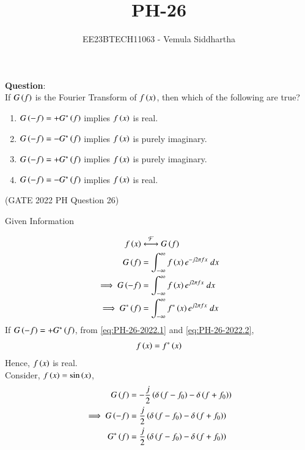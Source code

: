 \documentclass[journal,12pt,twocolumn]{IEEEtran}
\theoremstyle{remark}
\begin{document}

\vspace{3cm}

\title{PH-26}
\author{EE23BTECH11063 - Vemula Siddhartha}
\maketitle
\newpage
\bigskip

\renewcommand{\thefigure}{\theenumi}
\renewcommand{\thetable}{\theenumi}
\textbf{Question}:\\
If $G\left(f\right)$ is the Fourier Transform of $f\left(x\right)$, then which of the following are true?
\begin{enumerate}[label=(\alph*)]
    \item $G\left(-f\right)=+G^*\left(f\right)$ implies $f\left(x\right)$ is real.
    \item $G\left(-f\right)=-G^*\left(f\right)$ implies $f\left(x\right)$ is purely imaginary.
    \item $G\left(-f\right)=+G^*\left(f\right)$ implies $f\left(x\right)$ is purely imaginary.
    \item $G\left(-f\right)=-G^*\left(f\right)$ implies $f\left(x\right)$ is real.
\end{enumerate}
\hfill(GATE 2022 PH Question 26)\\
\solution
\begin{table}[h!]    
    \centering
    
    \caption{Given Information}
  \end{table}
\begin{align}
    f\brak{x} &\system{F} G\brak{f} \\
    G\brak{f} &= \int_{-\infty}^{\infty} f\brak{x} e^{-j 2 \pi f x}\;dx \\
    \implies G\brak{-f} &= \int_{-\infty}^{\infty} f\brak{x} e^{j 2 \pi f x}\; dx \label{eq:PH-26-2022.1} \\
    \implies G^*\brak{f} &= \int_{-\infty}^{\infty} f^*\brak{x} e^{j 2 \pi f x}\; dx \label{eq:PH-26-2022.2}
\end{align}
If $G\left(-f\right) = + G^*\left(f\right)$, from \eqref{eq:PH-26-2022.1} and \eqref{eq:PH-26-2022.2},
\begin{align}
    f\left(x\right) = f^*\left(x\right)
\end{align}
Hence, $f\left(x\right)$ is real. \\
Consider, $f\left(x\right)=\sin\left(x\right)$,
\begin{align}
    G\left(f\right) &= -\frac{j}{2} \left(\delta\left( f - f_0 \right) - \delta\left( f + f_0\right) \right) \\
    \implies G\left(-f\right) &= \frac{j}{2} \left(\delta\left( f - f_0 \right) - \delta\left( f + f_0 \right) \right) \\
    G^*\left(f\right) &= \frac{j}{2} \left(\delta\left( f - f_0 \right) - \delta\left( f + f_0 \right) \right)
\end{align}
\end{document}
